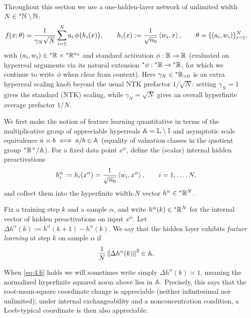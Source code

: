 Throughout this section we use a one-hidden-layer network of unlimited width $N \in {}^*\mathbb{N} \setminus \mathbb{N}$:
\begin{equation}\label{eq:4.4}
f(x; \theta) = \frac{1}{\gamma_N \sqrt{N}} \sum_{i=1}^N a_i\,\phi\bigl(h_i(x)\bigr), \qquad h_i(x) := \frac{1}{\sqrt{n_0}}\left\langle w_i, x \right\rangle, \qquad \theta = \{(a_i, w_i)\}_{i=1}^N,
\end{equation}
with $(a_i, w_i) \in {}^*\mathbb{R} \times {}^*\mathbb{R}^{n_0}$ and standard activation $\phi : \mathbb{R} \to \mathbb{R}$ (evaluated on hyperreal arguments via its natural extension ${}^*\phi : {}^*\mathbb{R} \to {}^*\mathbb{R}$, for which we continue to write $\phi$ when clear from context). Here $\gamma_N \in {}^*\mathbb{R}_{>0}$ is an extra hyperreal scaling knob beyond the usual NTK prefactor $1/\sqrt{N}$: setting $\gamma_N = 1$ gives the standard (NTK) scaling, while $\gamma_N = \sqrt{N}$ gives an overall hyperfinite average prefactor $1/N$.

We first make the notion of feature learning quantitative in terms of the multiplicative group of appreciable hyperreals $\mathbb{A} = \mathbb{L} \setminus \mathbb{I}$ and asymptotic scale equivalence $a \asymp b \iff a/b \in \mathbb{A}$ (equality of valuation classes in the quotient group ${}^*\mathbb{R}^\times / \mathbb{A}$). For a fixed data point $x^\alpha$, define the (scalar) internal hidden preactivations
\begin{equation}\label{eq:4.5}
h_i^\alpha := h_i(x^\alpha) = \frac{1}{\sqrt{n_0}}\left\langle w_i, x^\alpha \right\rangle, \qquad i = 1, \dots, N,
\end{equation}
and collect them into the hyperfinite width-$N$ vector $h^\alpha \in {}^*\mathbb{R}^N$.

\begin{definition}\label{def:4.1}
Fix a training step $k$ and a sample $\alpha$, and write $h^\alpha(k) \in {}^*\mathbb{R}^N$ for the internal vector of hidden preactivations on input $x^\alpha$. Let $\Delta h^\alpha(k) := h^\alpha(k + 1) - h^\alpha(k)$. We say that the hidden layer exhibits \emph{feature learning} at step $k$ on sample $\alpha$ if
\begin{equation}\label{eq:4.6}
\frac{1}{N}\left\lVert \Delta h^\alpha(k) \right\rVert^2 \in \mathbb{A}.
\end{equation}
\end{definition}

When \eqref{eq:4.6} holds we will sometimes write simply $\Delta h^\alpha(k) \asymp 1$, meaning the normalized hyperfinite squared norm above lies in $\mathbb{A}$. Precisely, this says that the root-mean-square coordinate change is appreciable (neither infinitesimal nor unlimited); under internal exchangeability and a nonconcentration condition, a Loeb-typical coordinate is then also appreciable.

